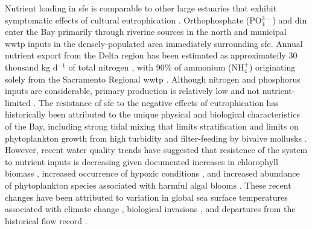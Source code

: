 \documentclass[letterpaper,12pt,oneside]{article}\usepackage[]{graphicx}\usepackage[]{color}
\begin{document}
Nutrient loading in \ac{sfe} is comparable to other large estuaries that exhibit symptomatic effects of cultural eutrophication \citep[e.g., Chesapeake Bay,][]{Kemp05}.  Orthophosphate (PO$_4^{3-}$) and \ac{din} enter the Bay primarily through riverine sources in the north and municipal \ac{wwtp} inputs in the densely-populated area immediately surrounding \ac{sfe}.  Annual nutrient export from the Delta region has been estimated as approximateily 30 thousand kg d$^{-1}$ of total nitrogen \citep[varying with flow,][]{Novick15}, with 90\% of ammonium (NH$_4^{+}$) originating solely from the Sacramento Regional \ac{wwtp} \citep{Jassby08}.  Although nitrogen and phosphorus inputs are considerable, primary production is relatively low and not nutrient-limited \citep{Jassby02,Kimmerer12}.  The resistance of \ac{sfe} to the negative effects of eutrophication has historically been attributed to the unique physical and biological characteristics of the Bay, including strong tidal mixing that limits stratification \citep{Cloern96,Thompson08} and limits on phytoplankton growth from high turbidity and filter-feeding by bivalve mollusks \citep{Thompson08,Crauder16}.  However, recent water quality trends have suggested that resistence of the system to nutrient inputs is decreasing given documented increases in chlorophyll biomass \citep{Cloern07}, increased occurrence of hypoxic conditions , and increased abundance of phytoplankton species associated with harmful algal blooms \citep{Lehman05,Lehman10}.  These recent changes have been attributed to variation in global sea surface temperatures associated with climate change \citep{Cloern07}, biological invasions \citep{Cohen98}, and departures from the historical flow record \citep{Enright09,Cloern12}.  
\end{document}
